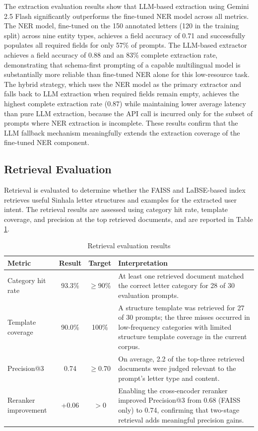 \documentclass[12pt]{uomthesis}
\begin{document}
The extraction evaluation results show that LLM-based extraction using Gemini 2.5 Flash significantly outperforms the fine-tuned NER model across all metrics. The NER model, fine-tuned on the 150 annotated letters (120 in the training split) across nine entity types, achieves a field accuracy of 0.71 and successfully populates all required fields for only 57\% of prompts. The LLM-based extractor achieves a field accuracy of 0.88 and an 83\% complete extraction rate, demonstrating that schema-first prompting of a capable multilingual model is substantially more reliable than fine-tuned NER alone for this low-resource task. The hybrid strategy, which uses the NER model as the primary extractor and falls back to LLM extraction when required fields remain empty, achieves the highest complete extraction rate (0.87) while maintaining lower average latency than pure LLM extraction, because the API call is incurred only for the subset of prompts where NER extraction is incomplete. These results confirm that the LLM fallback mechanism meaningfully extends the extraction coverage of the fine-tuned NER component.

\subsection{Retrieval Evaluation}

Retrieval is evaluated to determine whether the FAISS and LaBSE-based index retrieves useful Sinhala letter structures and examples for the extracted user intent. The retrieval results are assessed using category hit rate, template coverage, and precision at the top retrieved documents, and are reported in Table \ref{tab:retrieval_results}.

\begin{table}[!htbp]
\centering
\small
\begin{tabularx}{\linewidth}{@{}lccX@{}}
\toprule
\textbf{Metric} & \textbf{Result} & \textbf{Target} & \textbf{Interpretation} \\
\midrule
Category hit rate & 93.3\% & $\geq$90\% & At least one retrieved document matched the correct letter category for 28 of 30 evaluation prompts. \\
Template coverage & 90.0\% & 100\% & A structure template was retrieved for 27 of 30 prompts; the three misses occurred in low-frequency categories with limited structure template coverage in the current corpus. \\
Precision@3 & 0.74 & $\geq$0.70 & On average, 2.2 of the top-three retrieved documents were judged relevant to the prompt's letter type and content. \\
Reranker improvement & +0.06 & $>$0 & Enabling the cross-encoder reranker improved Precision@3 from 0.68 (FAISS only) to 0.74, confirming that two-stage retrieval adds meaningful precision gains. \\
\bottomrule
\end{tabularx}
\caption{Retrieval evaluation results}
\label{tab:retrieval_results}
\end{table}
\end{document}

